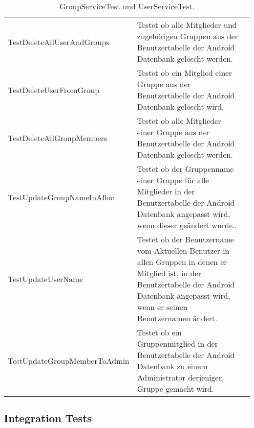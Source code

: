 \begin{table}[H]
{\begin{tabular}{|p{}|p{}|>{\centering}p{}|}
				\hspace{0pt}TestDeleteAllUserAndGroups & Testet ob alle Mitglieder und zugehörigen Gruppen aus der Benutzertabelle der Android Datenbank gelöscht werden. & \checkmark\tabularnewline
				\hspace{0pt}TestDeleteUserFromGroup & Testet ob ein Mitglied einer Gruppe aus der Benutzertabelle der Android Datenbank gelöscht wird. & \checkmark\tabularnewline
				\hspace{0pt}TestDeleteAllGroupMembers & Testet ob alle Mitglieder einer Gruppe aus der Benutzertabelle der Android Datenbank gelöscht werden. & \checkmark\tabularnewline
				\hspace{0pt}TestUpdateGroupNameInAlloc & Testet ob der Gruppenname einer Gruppe für alle Mitglieder in der Benutzertabelle der Android Datenbank angepasst wird, wenn dieser geändert wurde.. & \checkmark\tabularnewline
				\hspace{0pt}TestUpdateUserName & Testet ob der Benutzername vom Aktuellen Benutzer in allen Gruppen in denen er Mitglied ist, in der Benutzertabelle der Android Datenbank angepasst wird, wenn er seinen Benutzernamen ändert. & \checkmark\tabularnewline
				\hspace{0pt}TestUpdateGroupMemberToAdmin & Testet ob ein Gruppenmitglied in der Benutzertabelle der Android Datenbank zu einem Administrator derjenigen Gruppe gemacht wird. & \checkmark\tabularnewline
				\hline
			\end{tabular}}
			\caption{GroupServiceTest und UserServiceTest.}
		\end{table}

\subsection{Integration Tests}

